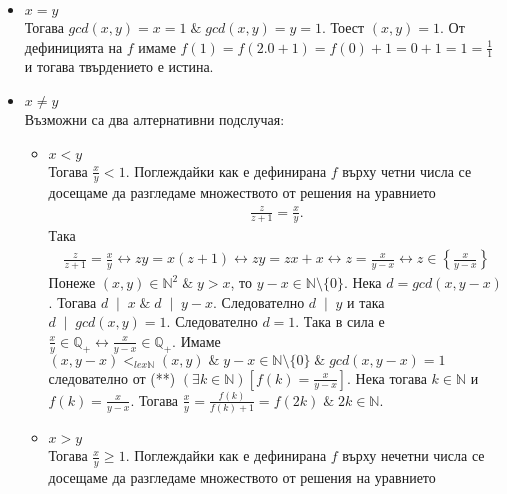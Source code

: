 \documentclass[a4paper, 12pt, oneside]{article}
\begin{document}
\begin{itemize}
\item \(x = y\)\\
Тогава \(gcd(x, y) = x = 1 \; \& \; gcd(x, y) = y = 1\). Тоест \((x, y) = 1\). От дефиницията на \(f\)
имаме \(f(1) = f(2.0 + 1) = f(0) + 1 = 0 + 1 = 1 = \displaystyle\frac{1}{1}\) и тогава твърдението е истина.
\item \(x \neq y\)\\
Възможни са два алтернативни подслучая:\\
    \begin{itemize}
    \item \(x < y\)\\
    Тогава \(\displaystyle\frac{x}{y} < 1\). Поглеждайки как е дефинирана \(f\) върху четни числа
    се досещаме да разгледаме множеството от решения на уравнието
    \begin{align*}
        \displaystyle\frac{z}{z + 1} = \displaystyle\frac{x}{y}.
    \end{align*}
    Така
    \begin{align*}
        \displaystyle\frac{z}{z + 1} = \displaystyle\frac{x}{y} \longleftrightarrow
        zy = x(z + 1) \longleftrightarrow zy = zx + x \longleftrightarrow
        z = \displaystyle\frac{x}{y - x} \longleftrightarrow z \in \left\{\displaystyle\frac{x}{y - x}\right\}
    \end{align*}
    Понеже \((x, y) \in \mathbb{N}^2 \; \& \; y > x\), то \(y - x \in \mathbb{N} \setminus \{0\}\).
    Нека \(d = gcd(x, y - x)\). Тогава \(d \; \mid \; x \; \& \; d \; \mid \; y - x\).
    Следователно \(d \; \mid \; y\) и така \(d \; \mid \; gcd(x, y) = 1\).
    Следователно \(d = 1\). Така в сила е \(\displaystyle\frac{x}{y} \in \mathbb{Q}_+ \longleftrightarrow \displaystyle\frac{x}{y - x} \in \mathbb{Q}_+\).
    Имаме \\
    \((x, y - x) <_{lex\mathbb{N}} (x, y) \; \& \; y - x \in \mathbb{N} \setminus \{0\} \; \& \; gcd(x, y - x) = 1\)
    следователно от (**) \((\exists k \in \mathbb{N})\left[f(k) = \displaystyle\frac{x}{y - x}\right]\).
    Нека тогава \(k \in \mathbb{N}\) и \(f(k) = \displaystyle\frac{x}{y - x}\).
    Тогава \(\displaystyle\frac{x}{y} = \displaystyle\frac{f(k)}{f(k) + 1} = f(2k) \; \& \; 2k \in \mathbb{N}\).
    \item \(x > y\)\\
    Тогава \(\displaystyle\frac{x}{y} \geq 1\). Поглеждайки как е дефинирана \(f\) върху нечетни числа
    се досещаме да разгледаме множеството от решения на уравнието

\end{itemize}
\end{itemize}
\end{document}
